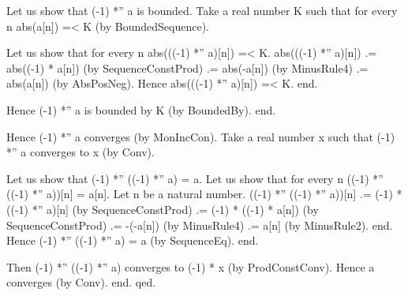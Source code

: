 \documentclass{article}
\newenvironment{forthel}{\begin{leftbar}}{\end{leftbar}}
\begin{document}
\begin{forthel}
	Let us show that (-1) *'' a is bounded.
	Take a real number K such that for every n abs(a[n]) =< K (by BoundedSequence).
	
	Let us show that for every n abs(((-1) *'' a)[n]) =< K.
	abs(((-1) *'' a)[n]) .= abs((-1) * a[n]) (by SequenceConstProd)
	.= abs(-a[n]) (by MinusRule4)
	.= abs(a[n]) (by AbsPosNeg).
	Hence abs(((-1) *'' a)[n]) =< K.
	end.
	
	Hence (-1) *'' a is bounded by K (by BoundedBy).
	end.
	
	Hence (-1) *'' a converges (by MonIncCon).
	Take a real number x such that (-1) *'' a converges to x (by Conv).
	
	Let us show that (-1) *'' ((-1) *'' a) = a.
	Let us show that for every n ((-1) *'' ((-1) *'' a))[n] = a[n].
	Let n be a natural number.
	((-1) *'' ((-1) *'' a))[n] .= (-1) * ((-1) *'' a)[n] (by SequenceConstProd)
	.= (-1) * ((-1) * a[n]) (by SequenceConstProd)
	.= -(-a[n]) (by MinusRule4)
	.= a[n] (by MinusRule2).
	end.
	Hence (-1) *'' ((-1) *'' a) = a (by SequenceEq).
	end.
	
	Then (-1) *'' ((-1) *'' a) converges to (-1) * x (by ProdConstConv).
	Hence a converges (by Conv).
	end.
	qed.
	
\end{forthel}
\end{document}
